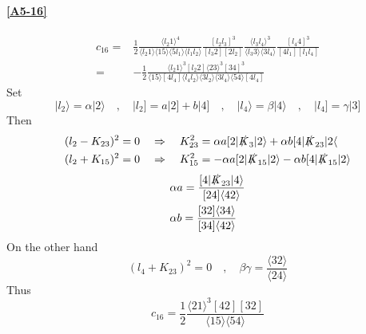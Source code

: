 \paragraph{\ref{A5-16}}
\begin{equation*}
\begin{split}
c_{16} = & \frac{1}{2}
\frac{\langle l_2 1 \rangle^4}{\langle l_2 1 \rangle\langle 15 \rangle\langle 5 l_1 \rangle\langle l_1 l_2\rangle}
\frac{[l_2 l_3]^3}{[l_3 2 ][2 l_2]}
\frac{\langle l_3 l_4\rangle^3}{\langle l_3 3\rangle\langle 3 l_4\rangle}
\frac{[l_4 4 ]^3}{[4l_1][l_1l_4]}
\\
= & 
-\frac{1}{2}\frac{\langle l_2 1\rangle^3[l_2 2 ]\langle 23 \rangle^3[34]^3}{\langle 15 \rangle[4l_4]\langle l_4 l_2\rangle\langle 3l_2\rangle \langle 3 l_4\rangle\langle 54\rangle[4l_4]}
\end{split}
\end{equation*}
Set
\begin{equation*}
|l_2\rangle = \alpha|2\rangle \quad,\quad
|l_2] = a|2] + b|4] \quad,\quad
|l_4\rangle = \beta |4\rangle \quad,\quad
|l_4] = \gamma|3]
\end{equation*}
Then
\begin{equation*}
\begin{split}
& (l_2 - K_{23})^2 = 0 \quad\Rightarrow\quad K_{23}^2 = \alpha a [2|\slashed{K}_3|2\rangle + \alpha b [4|\slashed{K}_{23}|2\langle
\\
& (l_2 + K_{15})^2 = 0 \quad\Rightarrow\quad K_{15}^2 = -\alpha a [2|\slashed{K}_{15}|2\rangle - \alpha b [4|\slashed{K}_{15}|2\rangle
\end{split}
\end{equation*}
\begin{equation*}
\begin{split}
& \alpha a = \frac{[4|\slashed{K}_{23}|4\rangle}{[24]\langle 42\rangle}
\\
& \alpha b = \frac{[32]\langle 34\rangle}{[34]\langle 42\rangle}
\end{split}
\end{equation*}
On the other hand
\begin{equation*}
(l_4 + K_{23})^2 = 0 \quad,\quad \beta\gamma = \frac{\langle 32\rangle}{\langle 24\rangle}
\end{equation*}
Thus
\begin{equation*}
c_{16}= \frac{1}{2}\frac{\langle 21\rangle^3[42][32]}{\langle 15\rangle\langle 54\rangle}
\end{equation*}

















